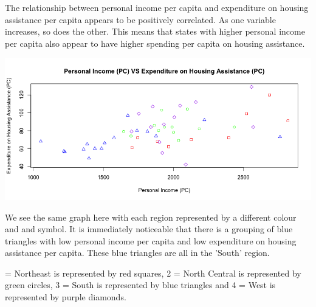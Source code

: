 \documentclass[12pt,letterpaper]{article}
\begin{document}
\noindent
The relationship between personal income per capita and expenditure on housing assistance per capita appears to be positively correlated. As one variable increases, so does the other. This means that states with higher personal income per capita also appear to have higher spending per capita on housing assistance.
\\\vspace{.5cm}



\newpage

\includegraphics[width=150mm]{Rplot X1 against Y colours}

\noindent
We see the same graph here with each region represented by a different colour and and symbol. It is immediately noticeable that there is a grouping of blue triangles with low personal income per capita and low expenditure on housing assistance per capita. These blue triangles are all in the 'South' region.
\\\vspace{.5cm}

 = Northeast is represented by red squares, 2 = North Central is represented by green circles, 3 = South is represented by blue triangles and 4 = West is represented by purple diamonds.
\\\vspace{.5cm}


\end{document}
